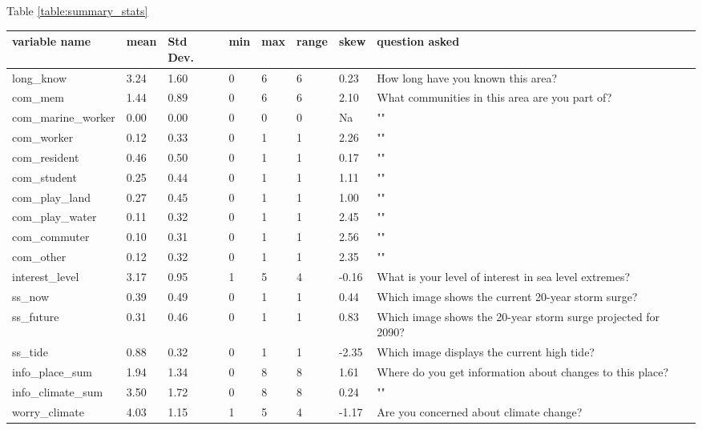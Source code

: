 \documentclass{article}
\begin{document}
Table \ref{table:summary_stats}

\begin{center}
\begin{table}[!ht]
    \centering
    \begin{tabular}{|l|l|l|l|l|l|l|l|}
    \hline
        variable name & mean & Std Dev. & min & max & range & skew & question asked \\ \hline
        long\_know & 3.24 & 1.60 & 0 & 6 & 6 & 0.23 & How long have you known this area? \\ \hline
        com\_mem & 1.44 & 0.89 & 0 & 6 & 6 & 2.10 & What communities in this area are you part of? \\ \hline
        com\_marine\_worker & 0.00 & 0.00 & 0 & 0 & 0 & Na & "" \\ \hline
        com\_worker & 0.12 & 0.33 & 0 & 1 & 1 & 2.26 & "" \\ \hline
        com\_resident & 0.46 & 0.50 & 0 & 1 & 1 & 0.17 & "" \\ \hline
        com\_student & 0.25 & 0.44 & 0 & 1 & 1 & 1.11 & "" \\ \hline
        com\_play\_land & 0.27 & 0.45 & 0 & 1 & 1 & 1.00 & "" \\ \hline
        com\_play\_water & 0.11 & 0.32 & 0 & 1 & 1 & 2.45 & "" \\ \hline
        com\_commuter & 0.10 & 0.31 & 0 & 1 & 1 & 2.56 & "" \\ \hline
        com\_other & 0.12 & 0.32 & 0 & 1 & 1 & 2.35 & "" \\ \hline
        interest\_level & 3.17 & 0.95 & 1 & 5 & 4 & -0.16 & What is your level of interest in sea level extremes? \\ \hline
        ss\_now & 0.39 & 0.49 & 0 & 1 & 1 & 0.44 & Which image shows the current 20-year storm surge? \\ \hline
        ss\_future & 0.31 & 0.46 & 0 & 1 & 1 & 0.83 & Which image shows the 20-year storm surge projected for 2090? \\ \hline
        ss\_tide & 0.88 & 0.32 & 0 & 1 & 1 & -2.35 & Which image displays the current high tide? \\ \hline
        info\_place\_sum & 1.94 & 1.34 & 0 & 8 & 8 & 1.61 & Where do you get information about changes to this place? \\ \hline
        info\_climate\_sum & 3.50 & 1.72 & 0 & 8 & 8 & 0.24 & "" \\ \hline
        worry\_climate & 4.03 & 1.15 & 1 & 5 & 4 & -1.17 & Are you concerned about climate change? \\ \hline

\end{tabular}
\end{table}
\end{center}
\end{document}

